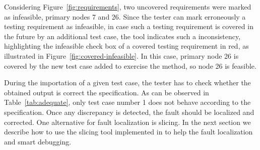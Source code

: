 

Considering Figure~\ref{fig:requirements}, two uncovered
requirements were marked as infeasible, primary nodes 7 and 26.
Since the tester can mark erroneously a testing requirement as
infeasible, in case such a testing requirement is covered in the
future by an additional test case, the tool indicates such a
inconsistency, highlighting the infeasible check box of a covered
testing requirement in red, as illustrated in
Figure~\ref{fig:covered-infeasible}. In this case, primary node 26
is covered by the new test case added to exercise the
 method, so node 26 is feasible.

During the importation of a given test case, the tester has to
check whether the obtained output is correct \wrt the
specification. As can be observed in Table~\ref{tab:adequate},
only test case number 1 does not behave according to the
specification. Once any discrepancy is detected, the fault should
be localized and corrected. One alternative for fault localization
is slicing. In the next section we describe how to use the slicing
tool implemented in \toolname to help the fault localization and
smart debugging.



\afterpage{\clearpage}
\newpage
